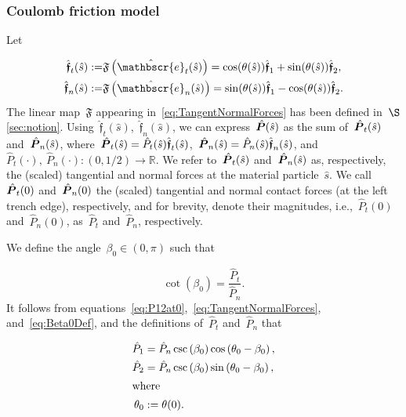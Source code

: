 \documentclass[preprint,10pt,times]{elsarticle}
\numberwithin{equation}{section}
\newcommand{\physe}{\hat{\mathbscr{e}}} %
\newcommand{\physf}{\hat{\boldsymbol{\mathfrak{f}}}}
\renewcommand{\u}[1]{\boldsymbol{#1}}
\newcommand{\chat}[1]{\skew{4}\hat{#1}}
\newcommand{\pr}[1]{\left( #1 \right)}
\begin{document}
\subsubsection{Coulomb friction model}

Let

\begin{subequations}
\begin{align}
\label{eq:ftstau}
\physf_{t}(\hat{s}):=
&\mathfrak{F}\pr{\physe_{t}(\hat{s})}=\cos(\theta(\hat{s}))\physf_{1}+\sin(\theta(\hat{s}))\physf_{2},\\
\label{eq:fnstau}
\physf_{n}(\hat{s}):=
&\mathfrak{F}\pr{\physe_{n}(\hat{s})}=\sin(\theta(\hat{s}))\physf_{1}-\cos(\theta(\hat{s}))\physf_{2}.
\end{align}
\label{eq:TangentNormalForces}
\end{subequations}The linear map~$\mathfrak{F}$ appearing in~\eqref{eq:TangentNormalForces}
has been defined in~$\S$\ref{sec:notion}. Using~$\physf_{t}(\hat{s})$,~$\physf_{n}(\hat{s})$,
we can express~$\chat{\u{P}}(\hat{s})$ as the sum of~$\chat{\u{P}}_{t}(\hat{s})$
and~$\chat{\u{P}}_{n}(\hat{s})$, where~$\chat{\u{P}}_{t}(\hat{s})=\hat{P}_{t}(\hat{s})\physf_{t}(\hat{s})$,~$\chat{\u{P}}_{n}(\hat{s})=\hat{P}_{n}(\hat{s})\physf_{n}(\hat{s})${,
and}~$\hat{P}_{t}(\cdot),~\hat{P}_{n}(\cdot): (0,1/2)\to\mathbb{R}$.
We refer to~$\chat{\u{P}}_t(\hat{s})$ and~$\chat{\u{P}}_n(\hat{s})$
as, respectively, the (scaled) tangential and normal forces at the
material particle~$\hat{s}$. We call~$\chat{\u{P}}_t(0)$ and~$\chat{\u{P}}_n(0)$
the (scaled) tangential and normal contact forces (at the left trench
edge), respectively, and for brevity, denote their magnitudes, i.e.,~$\hat{P}_{t}(0)$
and~$\hat{P}_{n}(0)$, as~$\hat{P}_{t}$ and~$\hat{P}_{n}$, respectively.

We define the angle~$\beta_0\in (0,\pi)$ such that

\begin{equation}
\cot\pr{\beta_0} =\frac{\hat{P}_{t}}{\hat{P}_{n}}.
\label{eq:Beta0Def}
\end{equation}It follows from equations~\eqref{eq:P12at0},~\eqref{eq:TangentNormalForces},
and~\eqref{eq:Beta0Def}, and the definitions of~$\hat{P}_{t}$
and~$\hat{P}_{n}$ that

\begin{subequations}
\begin{align}
\hat{P}_{1}&=\hat{P}_{n}\csc\pr{\beta_0}\cos\pr{\theta_0-\beta_0},
\label{eq:P1}
\\
\hat{P}_{2}& =\hat{P}_{n}\csc\pr{\beta_0}\sin\pr{\theta_0-\beta_0},
\label{eq:P2}
\\
\intertext{where}
\label{eq:Theta0}
\theta_{0}&:=\theta(0).
\end{align}
\label{eq:P1P2intoPn}
\end{subequations}
\end{document}
